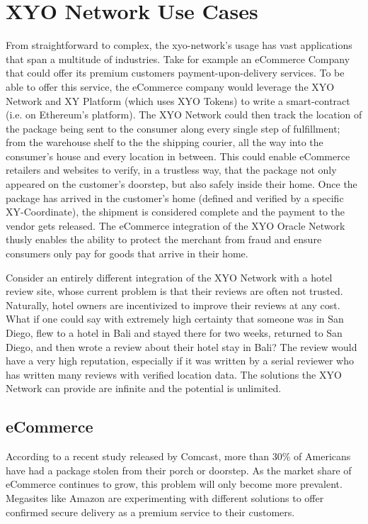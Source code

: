 \documentclass{article}
\begin{document}
\section{XYO Network Use Cases}
From straightforward to complex, the \Gls{xyo-network}'s usage  has vast applications that span a multitude of industries. Take for example an eCommerce Company that could offer its premium customers payment-upon-delivery services. To be able to offer this service, the eCommerce company would leverage the XYO Network and XY Platform (which uses XYO Tokens) to write a \gls{smart-contract} (i.e. on Ethereum's platform). The XYO Network could then track the location of the package being sent to the consumer along every single step of fulfillment; from the warehouse shelf to the the shipping courier, all the way into the consumer's house and every location in between. This could enable eCommerce retailers and websites to verify, in a trustless way, that the package not only appeared on the customer's doorstep, but also safely inside their home. Once the package has arrived in the customer's home (defined and verified by a specific XY-Coordinate), the shipment is considered complete and the payment to the vendor gets released. The eCommerce integration of the XYO Oracle Network thusly enables the ability to protect the merchant from fraud and ensure consumers only pay for goods that arrive in their home.

Consider an entirely different integration of the XYO Network with a hotel review site, whose current problem is that their reviews are often not trusted. Naturally, hotel owners are incentivized to improve their reviews at any cost. What if one could say with extremely high \gls{certainty} that someone was in San Diego, flew to a hotel in Bali and stayed there for two weeks, returned to San Diego, and then wrote a review about their hotel stay in Bali? The review would have a very high reputation, especially if it was written by a serial reviewer who has written many reviews with verified location data. The solutions the XYO Network can provide are infinite and the potential is unlimited.

\subsection{eCommerce}
According to a recent study released by Comcast, more than 30\% of Americans have had a package stolen from their porch or doorstep. As the market share of eCommerce continues to grow, this problem will only become more prevalent. Megasites like Amazon are experimenting with different solutions to offer confirmed secure delivery as a premium service to their customers. 
\end{document}
